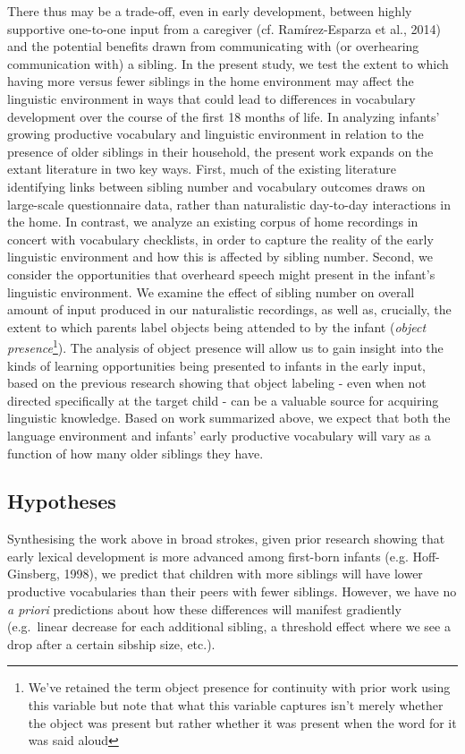 \documentclass[
  man,floatsintext]{apa6}
\begin{document}
There thus may be a trade-off, even in early development, between highly supportive one-to-one input from a caregiver (cf. Ramírez-Esparza et al., 2014) and the potential benefits drawn from communicating with (or overhearing communication with) a sibling. In the present study, we test the extent to which having more versus fewer siblings in the home environment may affect the linguistic environment in ways that could lead to differences in vocabulary development over the course of the first 18 months of life. In analyzing infants' growing productive vocabulary and linguistic environment in relation to the presence of older siblings in their household, the present work expands on the extant literature in two key ways. First, much of the existing literature identifying links between sibling number and vocabulary outcomes draws on large-scale questionnaire data, rather than naturalistic day-to-day interactions in the home. In contrast, we analyze an existing corpus of home recordings in concert with vocabulary checklists, in order to capture the reality of the early linguistic environment and how this is affected by sibling number. Second, we consider the opportunities that overheard speech might present in the infant's linguistic environment. We examine the effect of sibling number on overall amount of input produced in our naturalistic recordings, as well as, crucially, the extent to which parents label objects being attended to by the infant (\emph{object presence}\footnote{We’ve retained the term object presence for continuity with prior work using this variable but note that what this variable captures isn’t merely whether the object was present but rather whether it was present when the word for it was said aloud}). The analysis of object presence will allow us to gain insight into the kinds of learning opportunities being presented to infants in the early input, based on the previous research showing that object labeling - even when not directed specifically at the target child - can be a valuable source for acquiring linguistic knowledge. Based on work summarized above, we expect that both the language environment and infants' early productive vocabulary will vary as a function of how many older siblings they have.

\hypertarget{hypotheses}{%
\subsection{Hypotheses}\label{hypotheses}}

Synthesising the work above in broad strokes, given prior research showing that early lexical development is more advanced among first-born infants (e.g. Hoff-Ginsberg, 1998), we predict that children with more siblings will have lower productive vocabularies than their peers with fewer siblings. However, we have no \emph{a priori} predictions about how these differences will manifest gradiently (e.g.~linear decrease for each additional sibling, a threshold effect where we see a drop after a certain sibship size, etc.).
\end{document}
